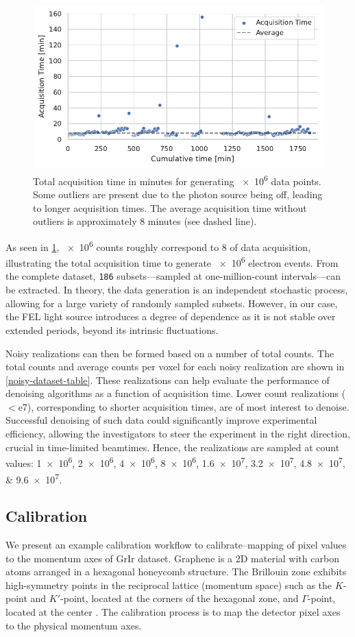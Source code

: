 \begin{figure}
    \centering
    \includegraphics[width=0.8\linewidth]{images/acq_time_1M.pdf}
    \caption{Total acquisition time in minutes for generating \num{e6} data points. Some outliers are present due to the photon source being off, leading to longer acquisition times. The average acquisition time without outliers is approximately 8 minutes (see dashed line).}
    \label{fig:acq-time-1M}
\end{figure}


As seen in \cref{fig:acq-time-1M}, \num{e6} counts roughly correspond to \qty{8}{\min} of data acquisition, illustrating the total acquisition time to generate \num{e6} electron events. From the complete dataset, \texttt{186} subsets—sampled at one-million-count intervals—can be extracted. In theory, the data generation is an independent stochastic process, allowing for a large variety of randomly sampled subsets. However, in our case, the \gls{FEL} light source introduces a degree of dependence as it is not stable over extended periods, beyond its intrinsic fluctuations.

Noisy realizations can then be formed based on a number of total counts. The total counts and average counts per voxel for each noisy realization are shown in \cref{noisy-dataset-table}. These realizations can help evaluate the performance of denoising algorithms as a function of acquisition time. Lower count realizations ($<$e7), corresponding to shorter acquisition times, are of most interest to denoise. Successful denoising of such data could significantly improve experimental efficiency, allowing the investigators to steer the experiment in the right direction, crucial in time-limited \glspl{beamtime}. Hence, the realizations are sampled at count values: \numlist{1e6;2e6;4e6;8e6;1.6e7;3.2e7;4.8e7;9.6e7}.


\subsection{Calibration}
We present an example calibration workflow to calibrate--mapping of pixel values to the momentum axes of \gls{GrIr} dataset. Graphene is a 2D material with carbon atoms arranged in a hexagonal honeycomb structure. The Brillouin zone exhibits high-symmetry points in the reciprocal lattice (momentum space) such as the $K$-point and $K'$-point, located at the corners of the hexagonal zone, and $\Gamma$-point, located at the center \cite{castronetoElectronicPropertiesGraphene2009}. The calibration process is to map the detector pixel axes to the physical momentum axes.

